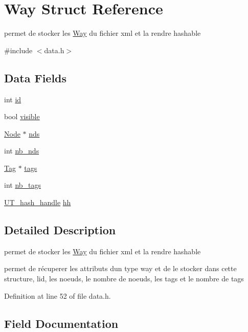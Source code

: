 \hypertarget{struct_way}{}\section{Way Struct Reference}
\label{struct_way}


permet de stocker les \hyperlink{struct_way}{Way} du fichier xml et la rendre hashable  




{\ttfamily \#include $<$data.\+h$>$}

\subsection*{Data Fields}
\begin{DoxyCompactItemize}
\item 
int \hyperlink{struct_way_a7441ef0865bcb3db9b8064dd7375c1ea}{id}
\item 
bool \hyperlink{struct_way_aa54a57ae048476d840caf6d4d2c47aa3}{visible}
\item 
\hyperlink{struct_node}{Node} $\ast$ \hyperlink{struct_way_aeda4fa95d94e394e147ebf2bfe497071}{nds}
\item 
int \hyperlink{struct_way_a2a8e25be588f6da164fe5fea4040d76c}{nb\+\_\+nds}
\item 
\hyperlink{struct_tag}{Tag} $\ast$ \hyperlink{struct_way_a5b3cb60eeefcbc271683754bf243aebb}{tags}
\item 
int \hyperlink{struct_way_a5090182abe45c6d1577adb6c195378f3}{nb\+\_\+tags}
\item 
\hyperlink{struct_u_t__hash__handle}{U\+T\+\_\+hash\+\_\+handle} \hyperlink{struct_way_a67d3d81a4f9a9622b0befade8d131661}{hh}
\end{DoxyCompactItemize}


\subsection{Detailed Description}
permet de stocker les \hyperlink{struct_way}{Way} du fichier xml et la rendre hashable 

permet de récuperer les attributs d\textquotesingle{}un type way et de le stocker dans cette structure, l\textquotesingle{}id, les noeuds, le nombre de noeuds, les tags et le nombre de tags 

Definition at line 52 of file data.\+h.



\subsection{Field Documentation}
